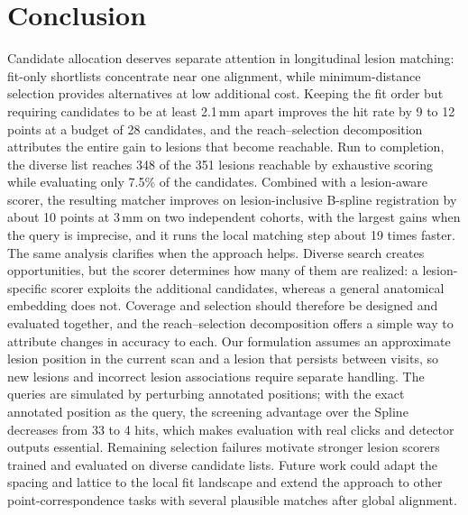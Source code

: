 \section{Conclusion}
\label{sec:conclusion}
\label{sec:discussion}
Candidate allocation deserves separate attention in longitudinal lesion matching: fit-only shortlists concentrate near one alignment, while minimum-distance selection provides alternatives at low additional cost.
Keeping the fit order but requiring candidates to be at least 2.1\,mm apart improves the hit rate by 9 to 12 points at a budget of 28 candidates, and the reach--selection decomposition attributes the entire gain to lesions that become reachable.
Run to completion, the diverse list reaches 348 of the 351 lesions reachable by exhaustive scoring while evaluating only 7.5\% of the candidates.
Combined with a lesion-aware scorer, the resulting matcher improves on lesion-inclusive B-spline registration by about 10 points at 3\,mm on two independent cohorts, with the largest gains when the query is imprecise, and it runs the local matching step about 19 times faster. The same analysis clarifies when the approach helps.
Diverse search creates opportunities, but the scorer determines how many of them are realized: a lesion-specific scorer exploits the additional candidates, whereas a general anatomical embedding does not.
Coverage and selection should therefore be designed and evaluated together, and the reach--selection decomposition offers a simple way to attribute changes in accuracy to each. Our formulation assumes an approximate lesion position in the current scan and a lesion that persists between visits, so new lesions and incorrect lesion associations require separate handling. The queries are simulated by perturbing annotated positions; with the exact annotated position as the query, the screening advantage over the Spline decreases from 33 to 4 hits, which makes evaluation with real clicks and detector outputs essential. Remaining selection failures motivate stronger lesion scorers trained and evaluated on diverse candidate lists. Future work could adapt the spacing and lattice to the local fit landscape and extend the approach to other point-correspondence tasks with several plausible matches after global alignment.
